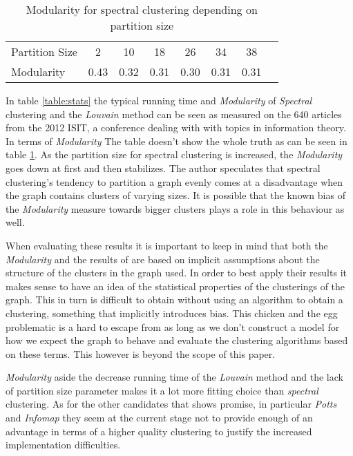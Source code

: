 \begin{table}
	\small
\begin{tabular}{l*{7}{c}}
	 Partition Size & 2 & 10 & 18 & 26 & 34 & 38 \\
	\noalign{\smallskip} 
	Modularity & 0.43 & 0.32 & 0.31 & 0.30 & 0.31 & 0.31
\end{tabular}
\caption{Modularity for spectral clustering depending on partition size}
\label{table:partition_size}
\end{table}

In table \ref{table:stats} the typical running time and 
\emph{Modularity} of \emph{Spectral} clustering and the \emph{Louvain} 
method can be seen as measured on the 640 articles from the 2012 ISIT, a 
conference dealing with with topics in information theory. In terms of 
\emph{Modularity} The table doesn't show the whole truth as can be seen 
in table \ref{table:partition_size}. As the partition size for spectral 
clustering is increased, the \emph{Modularity} goes down at first and 
then stabilizes.  The author speculates that spectral clustering's 
tendency to partition a graph evenly comes at a disadvantage when the 
graph contains clusters of varying sizes. It is possible that the known 
bias of the \emph{Modularity} measure towards bigger clusters plays a 
role in this behaviour as well.

When evaluating these results it is important to keep in mind that both 
the \emph{Modularity} and the results of \cite{lancichinetti2009} are 
based on implicit assumptions about the structure of the clusters in the 
graph used. In order to best apply their results it makes sense to have 
an idea of the statistical properties of the clusterings of the graph.  
This in turn is difficult to obtain without using an algorithm to obtain 
a clustering, something that implicitly introduces bias. This chicken 
and the egg problematic is a hard to escape from as long as we don't 
construct a model for how we expect the graph to behave and evaluate the 
clustering algorithms based on these terms. This however is beyond the 
scope of this paper.

\emph{Modularity} aside the decrease running time of the \emph{Louvain} 
method and the lack of partition size parameter makes it a lot more 
fitting choice than \emph{spectral} clustering. As for the other 
candidates that shows promise, in particular \emph{Potts} and 
\emph{Infomap} they seem at the current stage not to provide enough of 
an advantage in terms of a higher quality clustering to justify the 
increased implementation difficulties.



